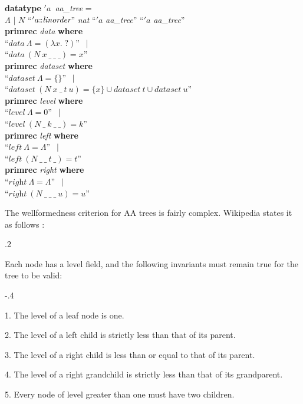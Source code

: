 \documentclass[a4paper,12pt]{article}
\def\Colon{\mathord{:\mkern-1.5mu:}}
\def\unk{{?}}
\def\undef{(\lambda x.\; \unk)}
\begin{document}
\prew
\textbf{datatype} $'a$~\textit{aa\_tree} = \\
\hbox{}\quad $\Lambda$ $\mid$ $N$ ``\kern1pt$'a\Colon \textit{linorder}$'' \textit{nat} ``\kern1pt$'a$ \textit{aa\_tree}'' ``\kern1pt$'a$ \textit{aa\_tree}''  \\[2\smallskipamount]
\textbf{primrec} \textit{data} \textbf{where} \\
``$\textit{data}~\Lambda = \undef$'' $\,\mid$ \\
``$\textit{data}~(N~x~\_~\_~\_) = x$'' \\[2\smallskipamount]
\textbf{primrec} \textit{dataset} \textbf{where} \\
``$\textit{dataset}~\Lambda = \{\}$'' $\,\mid$ \\
``$\textit{dataset}~(N~x~\_~t~u) = \{x\} \cup \textit{dataset}~t \mathrel{\cup} \textit{dataset}~u$'' \\[2\smallskipamount]
\textbf{primrec} \textit{level} \textbf{where} \\
``$\textit{level}~\Lambda = 0$'' $\,\mid$ \\
``$\textit{level}~(N~\_~k~\_~\_) = k$'' \\[2\smallskipamount]
\textbf{primrec} \textit{left} \textbf{where} \\
``$\textit{left}~\Lambda = \Lambda$'' $\,\mid$ \\
``$\textit{left}~(N~\_~\_~t~\_) = t$'' \\[2\smallskipamount]
\textbf{primrec} \textit{right} \textbf{where} \\
``$\textit{right}~\Lambda = \Lambda$'' $\,\mid$ \\
``$\textit{right}~(N~\_~\_~\_~u) = u$''
\postw

The wellformedness criterion for AA trees is fairly complex. Wikipedia states it
as follows \cite{wikipedia-2009-aa-trees}:

\kern.2\parskip %

\pre
Each node has a level field, and the following invariants must remain true for
the tree to be valid:

\raggedright

\kern-.4\parskip %

\begin{enum}
\item[]
\begin{enum}
\item[1.] The level of a leaf node is one.
\item[2.] The level of a left child is strictly less than that of its parent.
\item[3.] The level of a right child is less than or equal to that of its parent.
\item[4.] The level of a right grandchild is strictly less than that of its grandparent.
\item[5.] Every node of level greater than one must have two children.
\end{enum}
\end{enum}
\post
\end{document}
